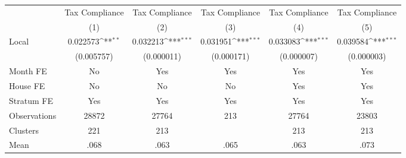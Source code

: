 {
\def\sym#1{\ifmmode^{#1}\else\(^{#1}\)\fi}
\begin{tabular}{l*{5}{c}}
\toprule
                &\multicolumn{1}{c}{Tax Compliance}&\multicolumn{1}{c}{Tax Compliance}&\multicolumn{1}{c}{Tax Compliance}&\multicolumn{1}{c}{Tax Compliance}&\multicolumn{1}{c}{Tax Compliance}\\
                &\multicolumn{1}{c}{(1)}         &\multicolumn{1}{c}{(2)}         &\multicolumn{1}{c}{(3)}         &\multicolumn{1}{c}{(4)}         &\multicolumn{1}{c}{(5)}         \\
\midrule
Local           & 0.022573\sym{**} & 0.032213\sym{***}& 0.031951\sym{***}& 0.033083\sym{***}& 0.039584\sym{***}\\
                &(0.005757)         &(0.000011)         &(0.000171)         &(0.000007)         &(0.000003)         \\
Month FE        &       No         &      Yes         &      Yes         &      Yes         &      Yes         \\
House FE        &       No         &       No         &       No         &      Yes         &      Yes         \\
Stratum FE      &      Yes         &      Yes         &      Yes         &      Yes         &      Yes         \\
\midrule
Observations    &    28872         &    27764         &      213         &    27764         &    23803         \\
Clusters        &      221         &      213         &                  &      213         &      213         \\
Mean            &     .068         &     .063         &     .065         &     .063         &     .073         \\
\bottomrule
\end{tabular}
}
